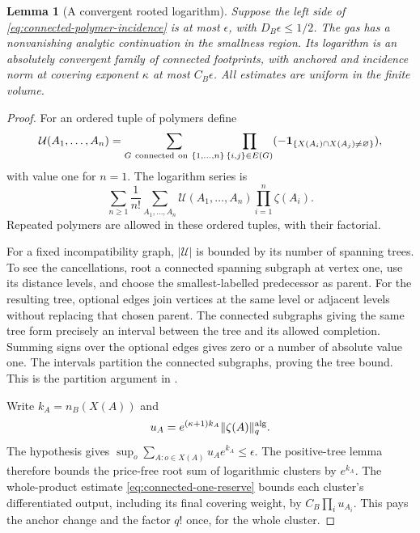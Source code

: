 \documentclass[11pt,reqno]{amsart}
\numberwithin{equation}{section}
\newtheorem{lemma}[theorem]{Lemma}
\theoremstyle{definition}
\theoremstyle{remark}
\begin{document}
\begin{lemma}[A convergent rooted logarithm]
\label{lem:connected-log-bound}
Suppose the left side of
\eqref{eq:connected-polymer-incidence}
is at most \(\epsilon\), with
\(D_B\epsilon\le1/2\).
The gas has a nonvanishing analytic
continuation in the smallness region.
Its logarithm is an absolutely convergent
family of connected footprints, with
anchored and incidence norm at covering
exponent \(\kappa\) at most \(C_B\epsilon\).
All estimates are uniform in the finite
volume.
\end{lemma}
\begin{proof}
For an ordered tuple of polymers define
\[
 \mathcal U(A_1,\ldots,A_n)
   =\sum_{G\ {\rm connected\ on}\ \{1,\ldots,n\}}
       \prod_{\{i,j\}\in E(G)}
                  (-\mathbf1_{\{X(A_i)\cap X(A_j)\ne\varnothing\}}),
\]
with value one for \(n=1\).
The logarithm series is
\begin{equation}
        \sum_{n\ge1}\frac1{n!}
          \sum_{A_1,\ldots,A_n}
               \mathcal U(A_1,\ldots,A_n)\prod_{i=1}^n\zeta(A_i).
 \label{eq:connected-Ursell-log}
\end{equation}
Repeated polymers are allowed in these
ordered tuples, with their factorial.

For a fixed incompatibility graph,
\(|\mathcal U|\) is bounded by its
number of spanning trees.
To see the cancellations, root a connected
spanning subgraph at vertex one, use its
distance levels, and choose the
smallest-labelled predecessor as parent.
For the resulting tree, optional edges
join vertices at the same level or
adjacent levels without replacing that
chosen parent.
The connected subgraphs giving the
same tree form precisely an interval
between the tree and its allowed
completion. Summing signs over the
optional edges gives zero or a number
of absolute value one.
The intervals partition the connected
subgraphs, proving the tree bound.
This is the partition argument in
\cite[Section~4.1, Proposition~5 and (4.4),
preprint p.~10]{FP07}.

Write \(k_A=n_B(X(A))\) and
\[
              u_A=e^{(\kappa+1)k_A}\|\zeta(A)\|^{\rm alg}_q .
\]
The hypothesis gives
\(\sup_o\sum_{A:o\in X(A)}u_Ae^{k_A}\le\epsilon\).
The positive-tree lemma therefore bounds
the price-free root sum of logarithmic
clusters by \(e^{k_A}\).
The whole-product estimate
\eqref{eq:connected-one-reserve} bounds
each cluster's differentiated output,
including its final covering weight,
by \(C_B\prod_i u_{A_i}\).
This pays the anchor change and the
factor \(q!\) once, for the whole cluster.


\end{proof}
\end{document}
